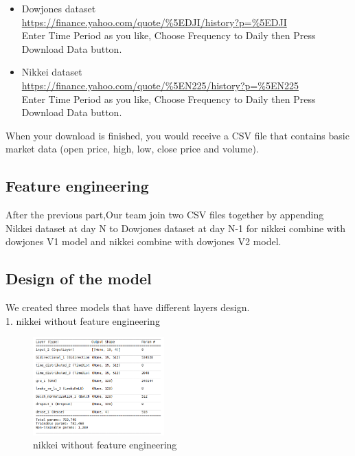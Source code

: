 \documentclass{article}
\begin{document}
\begin{itemize}
\item Dowjones dataset\\
\url{https://finance.yahoo.com/quote/%5EDJI/history?p=%5EDJI}
\\Enter Time Period as you like, Choose Frequency to Daily then Press Download Data button.
\end{itemize}

\begin{itemize}
\item Nikkei dataset\\
\url{https://finance.yahoo.com/quote/%5EN225/history?p=%5EN225}
\\Enter Time Period as you like, Choose Frequency to Daily then Press Download Data button.
\end{itemize}

When your download is finished, you would receive a CSV file that contains basic market data (open price, high, low, close price and volume).


\subsection{Feature engineering}
After the previous part,Our team join two CSV files together by appending Nikkei dataset at day N to Dowjones dataset at day N-1 for nikkei combine with dowjones V1 model and nikkei combine with dowjones V2 model.

\subsection{Design of the model}
We created three models that have different layers design.\\

1. nikkei without feature engineering\\

\label{sec:latex}
\begin{figure}
  \centering
  \centerline{\includegraphics[width=0.45\textwidth]{nk_n_fe.png}}
  \caption{nikkei without feature engineering}
  \label{fig:bibtex}
\end{figure}
\end{document}
